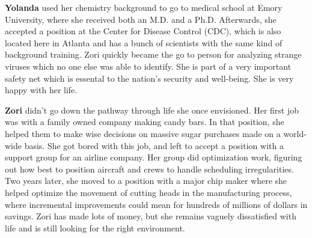 \medskip
\noindent
\textbf{Yolanda} used her chemistry background to go to medical school
at Emory University, where she received both an M.D. and a Ph.D.
Afterwards, she accepted a position at the Center for Disease Control
(CDC), which is also located here in Atlanta and has a bunch
of scientists with the same kind of background training.  Zori quickly became
the go to person for analyzing strange viruses which no one
else was able to identify.  She is part of a very important
safety net which is essental to the nation's security and well-being.
She is very happy with her life.

\medskip
\noindent
\textbf{Zori} didn't go down the pathway through life she once envisioned. 
Her first job was with a family owned company making candy bars. 
In that position, she helped them to make wise decisions on 
massive sugar purchases made on a world-wide basis.  
She got bored with this job, and left to accept a position with a 
support group for an airline company.  Her group did optimization 
work, figuring out how best to position
aircraft and crews to handle scheduling irregularities.  
Two years later, she moved to a position with
a major chip maker where she helped optimize the movement of
cutting heads in the manufacturing process, where incremental
improvements could mean for hundreds of millions of dollars
in savings.   Zori has made lots of money, but she remains
vaguely dissatisfied with life and is still looking for
the right environment.


